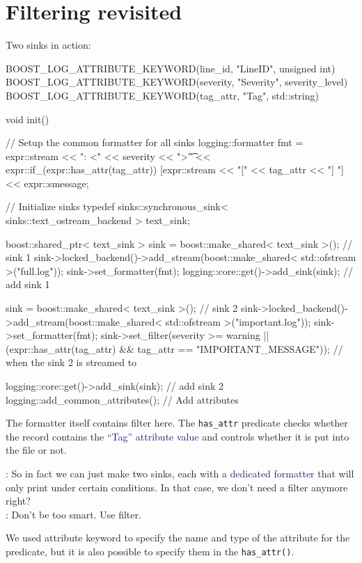 \documentclass[dvipsnames]{article}
\newcommand{\mycola}{MidnightBlue}
\newcommand{\cola}[1]{\textcolor{\mycola}{#1}}
\begin{document}
\section{Filtering revisited}
Two sinks in action:
\begin{simplec}
BOOST_LOG_ATTRIBUTE_KEYWORD(line_id, "LineID", unsigned int)
BOOST_LOG_ATTRIBUTE_KEYWORD(severity, "Severity", severity_level)
BOOST_LOG_ATTRIBUTE_KEYWORD(tag_attr, "Tag", std::string)

void init(){
  // Setup the common formatter for all sinks
  logging::formatter fmt = expr::stream
    << ": <" << severity << ">\t"
    << expr::if_(expr::has_attr(tag_attr)) [expr::stream << "[" << tag_attr << "] "]
    << expr::smessage;

  // Initialize sinks
  typedef sinks::synchronous_sink< sinks::text_ostream_backend > text_sink;

  boost::shared_ptr< text_sink > sink = boost::make_shared< text_sink >(); // sink 1
  sink->locked_backend()->add_stream(boost::make_shared< std::ofstream >("full.log"));
  sink->set_formatter(fmt);
  logging::core::get()->add_sink(sink); // add sink 1

  sink = boost::make_shared< text_sink >(); // sink 2
  sink->locked_backend()->add_stream(boost::make_shared< std::ofstream >("important.log"));
  sink->set_formatter(fmt);
  sink->set_filter(severity >= warning ||
                   (expr::has_attr(tag_attr) &&
                    tag_attr == "IMPORTANT_MESSAGE")); // when the sink 2 is streamed to

  logging::core::get()->add_sink(sink); // add sink 2
  logging::add_common_attributes(); // Add attributes
}
\end{simplec}

The formatter itself contains filter here. The \verb|has_attr| predicate checks
whether the record contains the \cola{``Tag'' attribute value} and controls whether it
is put into the file or not.

\begin{tcolorbox}
   : So in fact we can just make two sinks, each with a \cola{dedicated
  formatter} that will only print under certain conditions. In that case, we
  don't need a filter anymore right?\\
   : Don't be too smart. Use filter.
\end{tcolorbox}

We used attribute keyword to specify the name and type of the attribute for the
predicate, but it is also possible to specify them in the \verb|has_attr()|.
\end{document}
